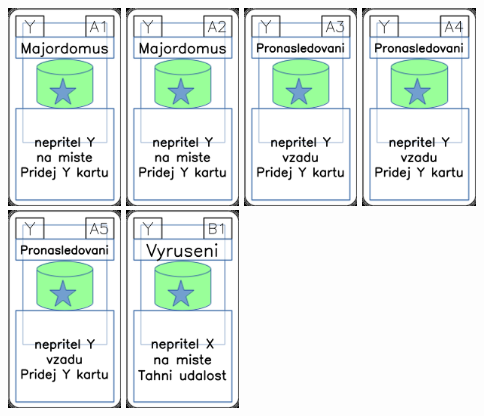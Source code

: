 \documentclass[a4paper]{article}
\begin{document}
	\includegraphics[width=3.0cm]{img-5_30}
	\includegraphics[width=3.0cm]{img-5_31}
	\includegraphics[width=3.0cm]{img-5_32}
	\includegraphics[width=3.0cm]{img-5_33}
	\includegraphics[width=3.0cm]{img-5_34}
	\includegraphics[width=3.0cm]{img-5_35}
\end{document}
